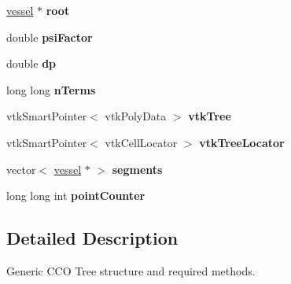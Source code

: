 \begin{DoxyCompactItemize}
\item 
\hyperlink{structvessel}{vessel} $\ast$ {\bfseries root}\hypertarget{class_abstract_structured_c_c_o_tree_acb2dfd906f3df9e57cdff7afcaa22073}{}\label{class_abstract_structured_c_c_o_tree_acb2dfd906f3df9e57cdff7afcaa22073}

\item 
double {\bfseries psi\+Factor}\hypertarget{class_abstract_structured_c_c_o_tree_a4cb13a700e00678a3fe08700294d68df}{}\label{class_abstract_structured_c_c_o_tree_a4cb13a700e00678a3fe08700294d68df}

\item 
double {\bfseries dp}\hypertarget{class_abstract_structured_c_c_o_tree_a9420e7bcfe82070a1c5776bdd3116d55}{}\label{class_abstract_structured_c_c_o_tree_a9420e7bcfe82070a1c5776bdd3116d55}

\item 
long long {\bfseries n\+Terms}\hypertarget{class_abstract_structured_c_c_o_tree_ab3069695ccaeffad30b4c2d495c55be6}{}\label{class_abstract_structured_c_c_o_tree_ab3069695ccaeffad30b4c2d495c55be6}

\item 
vtk\+Smart\+Pointer$<$ vtk\+Poly\+Data $>$ {\bfseries vtk\+Tree}\hypertarget{class_abstract_structured_c_c_o_tree_a9de62ed39b142c10f9bb781d31632763}{}\label{class_abstract_structured_c_c_o_tree_a9de62ed39b142c10f9bb781d31632763}

\item 
vtk\+Smart\+Pointer$<$ vtk\+Cell\+Locator $>$ {\bfseries vtk\+Tree\+Locator}\hypertarget{class_abstract_structured_c_c_o_tree_a0c25112aff221d43baea3a7e849c6a76}{}\label{class_abstract_structured_c_c_o_tree_a0c25112aff221d43baea3a7e849c6a76}

\item 
vector$<$ \hyperlink{structvessel}{vessel} $\ast$ $>$ {\bfseries segments}\hypertarget{class_abstract_structured_c_c_o_tree_a260ff9f6dfab06e63574655f95ed4ee3}{}\label{class_abstract_structured_c_c_o_tree_a260ff9f6dfab06e63574655f95ed4ee3}

\item 
long long int {\bfseries point\+Counter}\hypertarget{class_abstract_structured_c_c_o_tree_a715e34fae28f228a82a7dffdcf14c4b7}{}\label{class_abstract_structured_c_c_o_tree_a715e34fae28f228a82a7dffdcf14c4b7}

\end{DoxyCompactItemize}


\subsection{Detailed Description}
Generic C\+CO Tree structure and required methods. 

